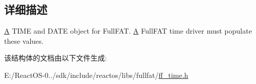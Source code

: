 \subsection{详细描述}
\hyperlink{struct_a}{A} T\+I\+ME and D\+A\+TE object for Full\+F\+AT. \hyperlink{struct_a}{A} Full\+F\+AT time driver must populate these values. 

该结构体的文档由以下文件生成\+:\begin{DoxyCompactItemize}
\item 
E\+:/\+React\+O\+S-\/0../sdk/include/reactos/libs/fullfat/\hyperlink{ff__time_8h}{ff\+\_\+time.\+h}\end{DoxyCompactItemize}
